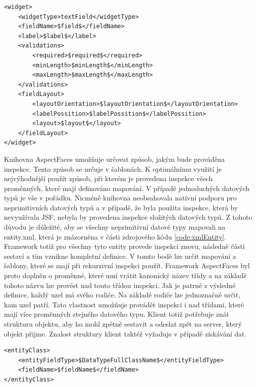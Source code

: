 \begin{lstlisting}[caption=Ukázka definice komponenty,
label={code:xmlInputField}, basicstyle=\footnotesize]
<widget>
	<widgetType>textField</widgetType>
	<fieldName>$field$</fieldName>
	<label>$label$</label>
	<validations>
		<required>$required$</required>
		<minLength>$minLength$</minLength>
		<maxLength>$maxLength$</maxLength>
	</validations>
	<fieldLayout>
		<layoutOrientation>$layoutOrientation$</layoutOrientation>
		<labelPossition>$labelPossition$</labelPossition>
		<layout>$layout$</layout>
	</fieldLayout>
</widget>
\end{lstlisting}
Knihovna AspectFaces umožňuje určovat způsob, jakým bude prováděna inspekce. Tento způsob se určuje v šablonách. K optimálnímu využití je nejvýhodnější použít způsob, při kterém je provedena inspekce všech proměnných, které mají definováno mapování. V případě jednoduchých datových typů je vše v pořádku. Nicméně knihovna neobsahovala nativní podporu pro neprimitivních datových typů a v případě, že byla použita inspekce, která by nevyužívala JSF, nebyla by provedena inspekce složitých datových typů. Z tohoto důvodu je důležité, aby se všechny neprimitivní datové typy mapovali na entity.xml, která je znázorněna v části zdrojového kódu \ref{code:xmlEntity}. Framework totiž pro všechny tyto entity provede inspekci znovu, následně části sestaví a tím vznikne kompletní definice. V tomto bodě lze určit mapování a šablony, které se mají při rekurzivní inspekci použít. Framework AspectFaces byl proto doplněn o proměnné, které umí vrátit kanonický název třídy a na základě tohoto názvu lze provést nad touto třídou inspekci. Jak je patrné z výsledné definice, každý uzel má svého rodiče. Na základě rodiče lze jednoznačně určit, kam uzel patří. Tato vlastnost umožňuje provádět inspekci i nad třídami, které mají více proměnných stejného datového typu. Klient totiž potřebuje znát strukturu objektu, aby ho mohl zpětně sestavit a odeslat zpět na server, který objekt přijme. Znalost struktury klient taktéž vyžaduje v případě získávání dat.
\begin{lstlisting}[caption=Ukázka definice neprimitivního datového typu,
label={code:xmlEntity}]
<entityClass>
	<entityFieldType>$DataTypeFullClassName$</entityFieldType>
	<fieldName>$fieldName$</fieldName>
</entityClass>
\end{lstlisting}

